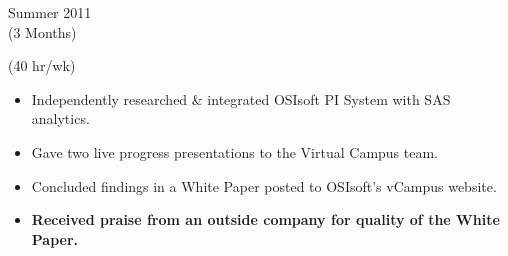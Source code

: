 \divLine

\flushleft \begin{minipage}[t]{\dateColWidth}
Summer 2011 \\
(3 Months)
\end{minipage}
\begin{minipage}[t]{0.8\textwidth}
 (40 hr/wk) \\[-1 em]
\begin{adjustwidth}{2.5 em}{0 em} 

\begin{itemize} \itemsep-2pt
\setlength{\itemindent}{-2 em}

\item Independently researched \& integrated OSIsoft PI System with SAS analytics.
\item Gave two live progress presentations to the Virtual Campus team.
\item Concluded findings in a White Paper posted to OSIsoft's vCampus website.
\item\textbf{Received praise from an outside company for quality of the White Paper.}
\end{itemize}

\end{adjustwidth}
\end{minipage}